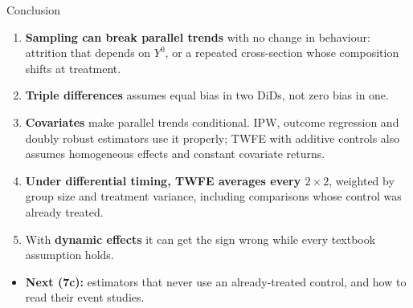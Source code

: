 \documentclass[
  11pt,
  ignorenonframetext,
  aspectratio=169,
]{beamer}
\providecommand{\tightlist}{%
  \setlength{\itemsep}{0pt}\setlength{\parskip}{0pt}}
\begin{document}
\begin{frame}{Conclusion}
\protect{}\label{conclusion}
\begin{enumerate}
\tightlist
\item
  \textbf{Sampling can break parallel trends} with no change in
  behaviour: attrition that depends on \(Y^0\), or a repeated
  cross-section whose composition shifts at treatment.
\item
  \textbf{Triple differences} assumes equal bias in two DiDs, not zero
  bias in one.
\item
  \textbf{Covariates} make parallel trends conditional. IPW, outcome
  regression and doubly robust estimators use it properly; TWFE with
  additive controls also assumes homogeneous effects and constant
  covariate returns.
\item
  \textbf{Under differential timing, TWFE averages every
  \(2 \times 2\)}, weighted by group size and treatment variance,
  including comparisons whose control was already treated.
\item
  With \textbf{dynamic effects} it can get the sign wrong while every
  textbook assumption holds.
\end{enumerate}

\vspace{0.4em}

\begin{itemize}
\tightlist
\item
  \textbf{Next (7c):} estimators that never use an already-treated
  control, and how to read their event studies.
\end{itemize}
\end{frame}
\end{document}
